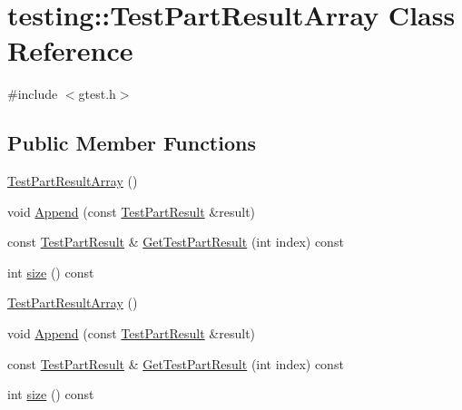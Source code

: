 \hypertarget{classtesting_1_1_test_part_result_array}{\section{testing\-:\-:Test\-Part\-Result\-Array Class Reference}
\label{classtesting_1_1_test_part_result_array}
}


{\ttfamily \#include $<$gtest.\-h$>$}

\subsection*{Public Member Functions}
\begin{DoxyCompactItemize}
\item 
\hyperlink{classtesting_1_1_test_part_result_array_ac9bfc830989c5328d7ff2ba8fa3c072b}{Test\-Part\-Result\-Array} ()
\item 
void \hyperlink{classtesting_1_1_test_part_result_array_a01844bd505b18a666324617a1b459558}{Append} (const \hyperlink{classtesting_1_1_test_part_result}{Test\-Part\-Result} \&result)
\item 
const \hyperlink{classtesting_1_1_test_part_result}{Test\-Part\-Result} \& \hyperlink{classtesting_1_1_test_part_result_array_a799a09c9ad8c1c8875400af78efe4b17}{Get\-Test\-Part\-Result} (int index) const 
\item 
int \hyperlink{classtesting_1_1_test_part_result_array_acd805ad4edda06d983456b2a30760dce}{size} () const 
\item 
\hyperlink{classtesting_1_1_test_part_result_array_ac9bfc830989c5328d7ff2ba8fa3c072b}{Test\-Part\-Result\-Array} ()
\item 
void \hyperlink{classtesting_1_1_test_part_result_array_a01844bd505b18a666324617a1b459558}{Append} (const \hyperlink{classtesting_1_1_test_part_result}{Test\-Part\-Result} \&result)
\item 
const \hyperlink{classtesting_1_1_test_part_result}{Test\-Part\-Result} \& \hyperlink{classtesting_1_1_test_part_result_array_a2b3dbf4012f204d916ce4a374bc03da4}{Get\-Test\-Part\-Result} (int index) const 
\item 
int \hyperlink{classtesting_1_1_test_part_result_array_acd805ad4edda06d983456b2a30760dce}{size} () const 
\end{DoxyCompactItemize}


